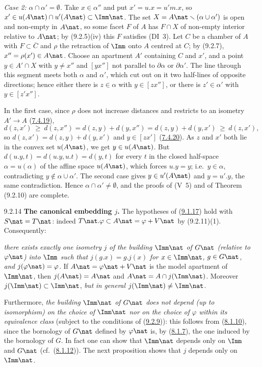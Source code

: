 \documentclass[12pt,a4paper,oneside,english]{smfart}
\makeatletter
\newcommand{\btanchor}[1]{\leavevmode\Hy@raisedlink{\hypertarget{bt:#1}{}}}
\newcommand{\btref}[1]{\hyperlink{bt:#1}{#1}}
\theoremstyle{definition}
\theoremstyle{bt}
\makeatother
\begin{document}
\smallskip
\emph{Case 2: $\alpha\cap\alpha'=\emptyset$.} Take $x\in\alpha''$ and put
$x'=u.x=u'm.x$, so $x'\in u(A\nat)\cap u'(A\nat)\subset\Imm\nat$. The set
$X=A\nat\smallsetminus(\alpha\cup\alpha')$ is open and non-empty in $A\nat$, so
some facet $F$ of $A$ has $F\cap X$ of non-empty interior relative to $A\nat$;
by (9.2.5)(iv) this $F$ satisfies (DI~3). Let $C$ be a chamber of $A$ with
$F\subset\overline C$ and $\rho$ the retraction of $\Imm$ onto $A$ centred at
$C$; by (9.2.7), $x''=\rho(x')\in A\nat$. Choose an apartment $A'$ containing
$C$ and $x'$, and a point $y\in A'\cap X$ with $y\neq x''$ and $[yx'']$ not
parallel to $\partial\alpha$ or $\partial\alpha'$. The line through this segment
meets both $\alpha$ and $\alpha'$, which cut out on it two half-lines of
opposite directions; hence either there is $z\in\alpha$ with $y\in[zx'']$, or
there is $z'\in\alpha'$ with $y\in[z'x'']$.

In the first case, since $\rho$ does not increase distances and restricts to an
isometry $A'\to A$ (\btref{7.4.19}),
\[
d(z,x')\ \ge\ d(z,x'')=d(z,y)+d(y,x'')=d(z,y)+d(y,x')\ \ge\ d(z,x'),
\]
so $d(z,x')=d(z,y)+d(y,x')$ and $y\in[zx']$ (\btref{7.4.20}). As $z$ and $x'$ both lie
in the convex set $u(A\nat)$, we get $y\in u(A\nat)$. But
$d(u.y,t)=d(u.y,u.t)=d(y,t)$ for every $t$ in the closed half-space
$\alpha=u(\alpha)$ of the affine space $u(A\nat)$, which forces $u.y=y$; i.e.\
$y\in\alpha$, contradicting $y\notin\alpha\cup\alpha'$. The second case gives
$y\in u'(A\nat)$ and $y=u'.y$, the same contradiction. Hence
$\alpha\cap\alpha'\neq\emptyset$, and the proofs of (V~5) and of Theorem
(9.2.10) are complete.

\num{9.2.14}\btanchor{9.2.14} \textbf{The canonical embedding $j$.}
The hypotheses of (\btref{9.1.17}) hold with $S\nat=T\nat$: indeed
$T\nat.\varphi\subset A\nat=\varphi+V\nat$ by (9.2.11)(1). Consequently:

\emph{there exists exactly one isometry $j$ of the building $\Imm\nat$ of
$G\nat$ (relative to $\varphi\nat$) into $\Imm$ such that $j(g.x)=g.j(x)$ for
$x\in\Imm\nat$, $g\in G\nat$, and $j(\varphi\nat)=\varphi$.}
If $A\nat=\varphi\nat+V\nat$ is the model apartment of $\Imm\nat$, then
$j(A\nat)=A\nat$ and $A\nat=A\cap j(\Imm\nat)$. Moreover
$j(\Imm\nat)\subset\Imm\nat$, \emph{but in general $j(\Imm\nat)\neq\Imm\nat$.}

Furthermore, \emph{the building $\Imm\nat$ of $G\nat$ does not depend (up to
isomorphism) on the choice of $\Imm\nat$ nor on the choice of $\varphi$ within
its equivalence class} (subject to the conditions of (\btref{9.2.9})): this follows from
(\btref{8.1.10}), since the bornology of $G\nat$ defined by $\varphi\nat$ is, by
(\btref{8.1.7}), the one induced by the bornology of $G$. In fact one can show that
$\Imm\nat$ depends only on $\Imm$ and $G\nat$ (cf.\ (\btref{8.1.12})). The next
proposition shows that $j$ depends only on $\Imm\nat$.
\end{document}

